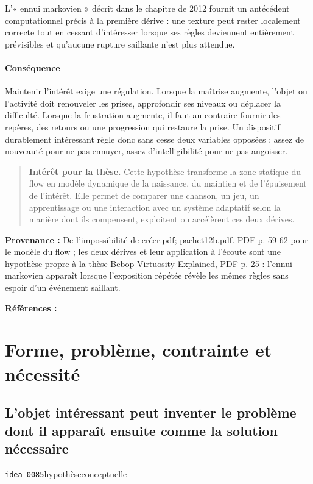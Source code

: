 \documentclass[10pt,a4paper]{article}
\begin{document}
L'« ennui markovien » décrit dans le chapitre de 2012 fournit un antécédent computationnel précis à la première dérive : une texture peut rester localement correcte tout en cessant d'intéresser lorsque ses règles deviennent entièrement prévisibles et qu'aucune rupture saillante n'est plus attendue.

\paragraph{Conséquence}
Maintenir l'intérêt exige une régulation. Lorsque la maîtrise augmente, l'objet ou l'activité doit renouveler les prises, approfondir ses niveaux ou déplacer la difficulté. Lorsque la frustration augmente, il faut au contraire fournir des repères, des retours ou une progression qui restaure la prise. Un dispositif durablement intéressant règle donc sans cesse deux variables opposées : assez de nouveauté pour ne pas ennuyer, assez d'intelligibilité pour ne pas angoisser.

\begin{quote}
\textbf{Intérêt pour la thèse.} Cette hypothèse transforme la zone statique du flow en modèle dynamique de la naissance, du maintien et de l'épuisement de l'intérêt. Elle permet de comparer une chanson, un jeu, un apprentissage ou une interaction avec un système adaptatif selon la manière dont ils compensent, exploitent ou accélèrent ces deux dérives.
\end{quote}
{\footnotesize\color{metadata}\textbf{Provenance :} De l'impossibilité de créer.pdf; pachet12b.pdf. PDF p. 59-62 pour le modèle du flow ; les deux dérives et leur application à l'écoute sont une hypothèse propre à la thèse Bebop Virtuosity Explained, PDF p. 25 : l'ennui markovien apparaît lorsque l'exposition répétée révèle les mêmes règles sans espoir d'un événement saillant.\par}
{\footnotesize\color{metadata}\textbf{Références :} \parencite{pachet2012virtuosity}\par}

\section{Forme, problème, contrainte et nécessité}

\subsection{L'objet intéressant peut inventer le problème dont il apparaît ensuite comme la solution nécessaire}
{\small\color{metadata} \texttt{idea\_0085}\quad\textbullet\quad hypothèse\quad\textbullet\quad conceptuelle\par}
\end{document}
